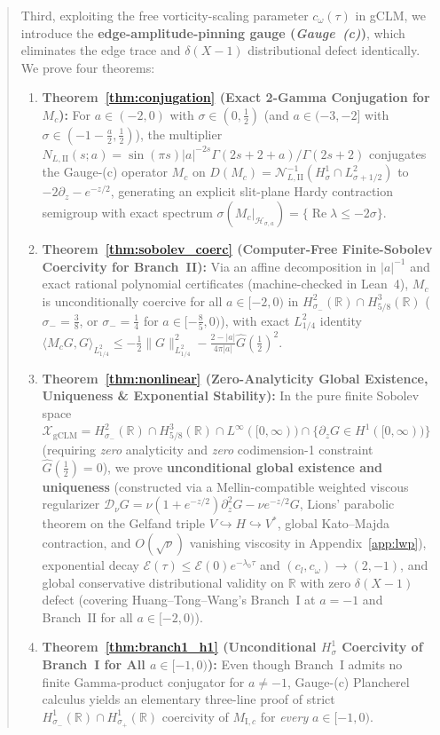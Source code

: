 \documentclass[11pt,a4paper]{article}
\begin{document}
\begin{abstract}
Third, exploiting the free vorticity-scaling parameter $c_\omega(\tau)$ in gCLM, we introduce the \textbf{edge-amplitude-pinning gauge (\emph{Gauge~(c)})}, which eliminates the edge trace and $\delta(X-1)$ distributional defect identically. We prove four theorems:
\begin{enumerate}
  \item \textbf{Theorem~\ref{thm:conjugation} (Exact 2-Gamma Conjugation for $M_c$):} For $a \in (-2,0)$ with $\sigma \in (0,\frac{1}{2})$ (and $a \in (-3,-2]$ with $\sigma \in (-1-\frac{a}{2},\frac{1}{2})$), the multiplier $N_{L,\mathrm{II}}(s;a) = \sin(\pi s)|a|^{-2s}\Gamma(2s+2+a)/\Gamma(2s+2)$ conjugates the Gauge-(c) operator $M_c$ on $D(M_c) = \mathcal{N}_{L,\mathrm{II}}^{-1}(H^1_\sigma \cap L^2_{\sigma+1/2})$ to $-2\partial_z - e^{-z/2}$, generating an explicit slit-plane Hardy contraction semigroup with exact spectrum $\sigma(M_c|_{\mathcal{H}_{\sigma,a}}) = \{\operatorname{Re}\lambda \le -2\sigma\}$.
  \item \textbf{Theorem~\ref{thm:sobolev_coerc} (Computer-Free Finite-Sobolev Coercivity for Branch~II):} Via an affine decomposition in $|a|^{-1}$ and exact rational polynomial certificates (machine-checked in Lean~4), $M_c$ is unconditionally coercive for all $a \in [-2,0)$ in $H^2_{\sigma_-}(\mathbb{R}) \cap H^3_{5/8}(\mathbb{R})$ ($\sigma_- = \frac{3}{8}$, or $\sigma_- = \frac{1}{4}$ for $a \in [-\frac{8}{5},0)$), with exact $L^2_{1/4}$ identity $\langle M_c G, G\rangle_{L^2_{1/4}} \le -\frac{1}{2}\|G\|_{L^2_{1/4}}^2 - \frac{2-|a|}{4\pi|a|}\widehat{G}(\frac{1}{2})^2$.
  \item \textbf{Theorem~\ref{thm:nonlinear} (Zero-Analyticity Global Existence, Uniqueness \& Exponential Stability):} In the pure finite Sobolev space $\mathcal{X}_{\mathrm{gCLM}} = H^2_{\sigma_-}(\mathbb{R}) \cap H^3_{5/8}(\mathbb{R}) \cap L^\infty([0,\infty)) \cap \{\partial_z G \in H^1([0,\infty))\}$ (requiring \emph{zero} analyticity and \emph{zero} codimension-1 constraint $\widehat{G}(\frac{1}{2})=0$), we prove \textbf{unconditional global existence and uniqueness} (constructed via a Mellin-compatible weighted viscous regularizer $\mathcal{D}_\nu G = \nu(1+e^{-z/2})\partial_z^2 G - \nu e^{-z/2}G$, Lions' parabolic theorem on the Gelfand triple $V \hookrightarrow H \hookrightarrow V^*$, global Kato--Majda contraction, and $O(\sqrt{\nu})$ vanishing viscosity in Appendix~\ref{app:lwp}), exponential decay $\mathcal{E}(\tau) \le \mathcal{E}(0)e^{-\lambda_0\tau}$ and $(c_l, c_\omega) \to (2,-1)$, and global conservative distributional validity on $\mathbb{R}$ with zero $\delta(X-1)$ defect (covering Huang--Tong--Wang's Branch~I at $a = -1$ and Branch~II for all $a \in [-2,0)$).
  \item \textbf{Theorem~\ref{thm:branch1_h1} (Unconditional $H^1_\sigma$ Coercivity of Branch~I for All $a \in [-1,0)$):} Even though Branch~I admits no finite Gamma-product conjugator for $a \ne -1$, Gauge-(c) Plancherel calculus yields an elementary three-line proof of strict $H^1_{\sigma_-}(\mathbb{R}) \cap H^1_{\sigma_+}(\mathbb{R})$ coercivity of $M_{\mathrm{I},c}$ for \emph{every} $a \in [-1,0)$.
\end{enumerate}


\end{abstract}
\end{document}

